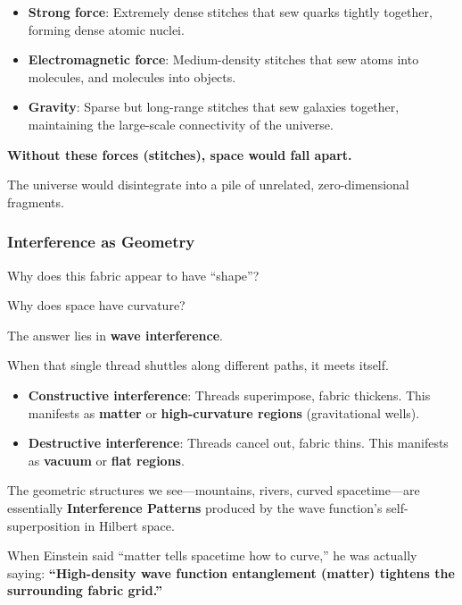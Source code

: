 \begin{itemize}
\item \textbf{Strong force}: Extremely dense stitches that sew quarks tightly together, forming dense atomic nuclei.

\item \textbf{Electromagnetic force}: Medium-density stitches that sew atoms into molecules, and molecules into objects.

\item \textbf{Gravity}: Sparse but long-range stitches that sew galaxies together, maintaining the large-scale connectivity of the universe.
\end{itemize}

\textbf{Without these forces (stitches), space would fall apart.}

The universe would disintegrate into a pile of unrelated, zero-dimensional fragments.

\subsubsection{Interference as Geometry}

Why does this fabric appear to have ``shape''?

Why does space have curvature?

The answer lies in \textbf{wave interference}.

When that single thread shuttles along different paths, it meets itself.

\begin{itemize}
\item \textbf{Constructive interference}: Threads superimpose, fabric thickens. This manifests as \textbf{matter} or \textbf{high-curvature regions} (gravitational wells).

\item \textbf{Destructive interference}: Threads cancel out, fabric thins. This manifests as \textbf{vacuum} or \textbf{flat regions}.
\end{itemize}

The geometric structures we see---mountains, rivers, curved spacetime---are essentially \textbf{Interference Patterns} produced by the wave function's self-superposition in Hilbert space.

When Einstein said ``matter tells spacetime how to curve,'' he was actually saying: \textbf{``High-density wave function entanglement (matter) tightens the surrounding fabric grid.''}

